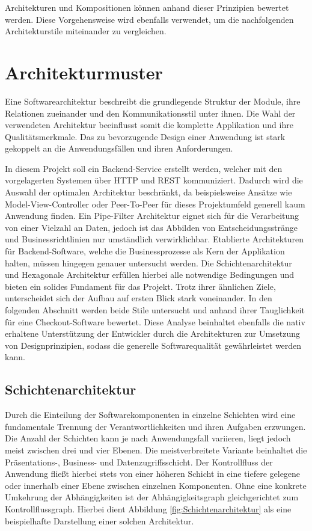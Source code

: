 Architekturen und Kompositionen können anhand dieser Prinzipien bewertet werden. Diese Vorgehensweise wird ebenfalls verwendet, um die nachfolgenden Architekturstile miteinander zu vergleichen. 

\section{Architekturmuster}

Eine Softwarearchitektur beschreibt die grundlegende Struktur der Module, ihre Relationen zueinander und den Kommunikationsstil unter ihnen. Die Wahl der verwendeten Architektur beeinflusst somit die komplette Applikation und ihre Qualitätsmerkmale. Das zu bevorzugende Design einer Anwendung ist stark gekoppelt an die Anwendungsfällen und ihren Anforderungen. 

In diesem Projekt soll ein Backend-Service erstellt werden, welcher mit den vorgelagerten Systemen über \acrshort{HTTP} und \acrshort{REST} kommuniziert. Dadurch wird die Auswahl der optimalen Architektur beschränkt, da beispielsweise Ansätze wie Model-View-Controller oder Peer-To-Peer für dieses Projektumfeld generell kaum Anwendung finden. Ein Pipe-Filter Architektur eignet sich für die Verarbeitung von einer Vielzahl an Daten, jedoch ist das Abbilden von Entscheidungsstränge und Businessrichtlinien nur umständlich verwirklichbar. Etablierte Architekturen für Backend-Software, welche die Businessprozesse als Kern der Applikation halten, müssen hingegen genauer untersucht werden. Die Schichtenarchitektur und Hexagonale Architektur erfüllen hierbei alle notwendige Bedingungen und bieten ein solides Fundament für das Projekt. Trotz ihrer ähnlichen Ziele, unterscheidet sich der Aufbau auf ersten Blick stark voneinander. In den folgenden Abschnitt werden beide Stile untersucht und anhand ihrer Tauglichkeit für eine Checkout-Software bewertet. Diese Analyse beinhaltet ebenfalls die nativ erhaltene Unterstützung der Entwickler durch die Architekturen zur Umsetzung von Designprinzipien, sodass die generelle Softwarequalität gewährleistet werden kann. 

\subsection{Schichtenarchitektur}

Durch die Einteilung der Softwarekomponenten in einzelne Schichten wird eine fundamentale Trennung der Verantwortlichkeiten und ihren Aufgaben erzwungen. Die Anzahl der Schichten kann je nach Anwendungsfall variieren, liegt jedoch meist zwischen drei und vier Ebenen. Die meistverbreitete Variante beinhaltet die Präsentations-, Business- und Datenzugriffsschicht. Der Kontrollfluss der Anwendung fließt hierbei stets von einer höheren Schicht in eine tiefere gelegene oder innerhalb einer Ebene zwischen einzelnen Komponenten. Ohne eine konkrete Umkehrung der Abhängigkeiten ist der Abhängigkeitsgraph gleichgerichtet zum Kontrollflussgraph. Hierbei dient Abbildung \ref{fig:Schichtenarchitektur} als eine beispielhafte Darstellung einer solchen Architektur. 

